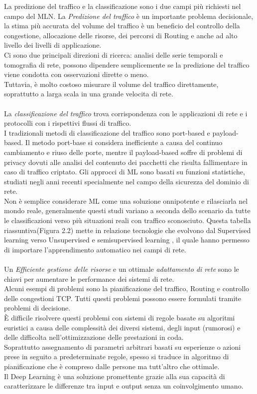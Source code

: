 \documentclass[../tesi.tex]{subfiles}
\begin{document}
La predizione del traffico e la classificazione sono i due campi più richiesti nel campo del MLN.
La \textit{Predizione del traffico} è un importante problema decisionale, la stima più accurata del volume del traffico è un beneficio del controllo della congestione, allocazione delle risorse, dei percorsi di Routing e anche ad alto livello dei livelli di applicazione.\\
Ci sono due principali direzioni di ricerca: analisi delle serie temporali e tomografia di rete, possono dipendere semplicemente se la predizione del traffico viene condotta con osservazioni dirette o meno.\\
Tuttavia, è molto costoso misurare il volume del traffico direttamente, soprattutto a larga scala in una grande velocita di rete.\\
\\
La \textit{classificazione del traffico} trova corrispondenza con le applicazioni di rete e i protocolli con i rispettivi flussi di traffico.\\
I tradizionali metodi di classificazione del traffico sono  \Gls{port-based} e \Gls{payload-based}. Il metodo port-base si considera inefficiente a causa del continuo cambiamento e riuso delle porte, mentre il payload-based soffre di problemi di privacy dovuti alle analisi del contenuto dei pacchetti che risulta fallimentare in caso di traffico criptato.
Gli approcci di ML sono basati su funzioni statistiche, studiati negli anni recenti specialmente nel campo della sicurezza del dominio di rete.\\
Non è semplice considerare ML come una soluzione onnipotente e rilasciarla nel mondo reale, generalmente questi studi variano a seconda dello scenario da tutte le classificazioni verso più situazioni reali con traffico sconosciuto. Questa tabella riassuntiva(Figura 2.2) mette in relazione tecnologie che evolvono dal Supervised learning verso Unsupervised e semisupervised learning , il quale hanno permesso di importare l’apprendimento automatico nei campi di rete.\\
\\
Un \textit{Efficiente gestione delle risorse} e un ottimale \textit{adattamento di rete} sono le chiavi per aumentare le performance dei sistemi di rete.\\
Alcuni esempi di problemi sono la pianificazione del traffico, Routing e controllo delle congestioni TCP. Tutti questi problemi possono essere formulati tramite problemi di decisione.\\
È difficile risolvere questi problemi con sistemi di regole basate su algoritmi euristici a causa delle complessità dei diversi sistemi, degli input (rumorosi) e delle difficolta nell’ottimizzazione delle prestazioni in coda.\\
Soprattutto assegnamento di parametri arbitrari basati su esperienze o azioni prese in seguito a predeterminate regole, spesso si traduce in algoritmo di pianificazione che è compreso dalle persone ma tutt’altro che ottimale.\\
Il \Gls{Deep Learning} è una soluzione promettente grazie alla sua capacità di caratterizzare le differenze tra input e output senza un coinvolgimento umano.
\end{document}
